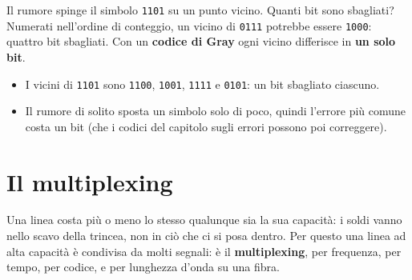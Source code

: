 \begin{minipage}{0.4\linewidth}
\centering
{}
\end{minipage}\hfill
\begin{minipage}{0.56\linewidth}
Il rumore spinge il simbolo \texttt{1101} su un punto vicino. Quanti bit sono sbagliati? Numerati nell'ordine di conteggio, un vicino
di \texttt{0111} potrebbe essere \texttt{1000}: quattro bit sbagliati. Con un \textbf{codice di Gray} ogni vicino differisce in
\textbf{un solo bit}.
\begin{itemize}
    \item I vicini di \texttt{1101} sono \texttt{1100}, \texttt{1001}, \texttt{1111} e \texttt{0101}: un bit sbagliato ciascuno.
    \item Il rumore di solito sposta un simbolo solo di poco, quindi l'errore più comune costa un bit (che i codici del capitolo sugli
          errori possono poi correggere).
\end{itemize}
\end{minipage}

\section{Il multiplexing}

Una linea costa più o meno lo stesso qualunque sia la sua capacità: i soldi vanno nello scavo della trincea, non in ciò che ci si posa
dentro. Per questo una linea ad alta capacità è condivisa da molti segnali: è il \textbf{multiplexing}, per frequenza, per tempo, per
codice, e per lunghezza d'onda su una fibra.

